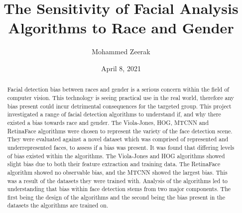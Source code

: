 \documentclass{l4proj}
\begin{document}
\title{The Sensitivity of Facial Analysis Algorithms to Race and Gender}
\author{Mohammed Zeerak}
\date{April 8, 2021}

\maketitle

\begin{abstract}
    
    Facial detection bias between races and gender is a serious concern within the field of computer vision. This technology is seeing practical use in the real world, therefore any bias present could incur detrimental consequences for the targeted group. This project investigated a range of facial detection algorithms to understand if, and why there existed a bias towards race and gender. The Viola-Jones, HOG, MTCNN and RetinaFace algorithms were chosen to represent the variety of the face detection scene. They were evaluated against a novel dataset which was comprised of represented and underrepresented faces, to assess if a bias was present. It was found that differing levels of bias existed within the algorithms. The Viola-Jones and HOG algorithms showed slight bias due to both their feature extraction and training data. The RetinaFace algorithm showed no observable bias, and the MTCNN showed the largest bias. This was a result of the datasets they were trained with. Analysis of the algorithms led to understanding that bias within face detection stems from two major components. The first being the design of the algorithms and the second being the bias present in the datasets the algorithms are trained on.
    
\end{abstract}


%
%
\def\consentname {Mohammed Zeerak} %
\def\consentdate {6 March 2021} %
%
\educationalconsent
\end{document}
